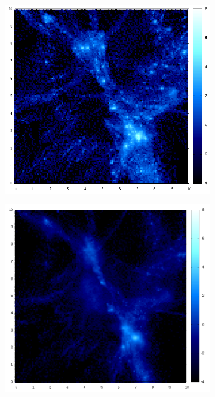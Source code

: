 \documentclass[journal]{IEEEtran}
\begin{document}
\begin{figure}[h!]
\begin{subfigure}[t]{0.25\textwidth}
	\end{subfigure}
	\\
	\begin{subfigure}[t]{0.25\textwidth}
		\centering
		\includegraphics[width=\linewidth]{DM02-03.png}
	\end{subfigure}
	\quad
	\begin{subfigure}[t]{0.25\textwidth}
		\centering
		\includegraphics[width=\linewidth]{GAS02-03.png}

\end{subfigure}
\end{figure}
\end{document}
